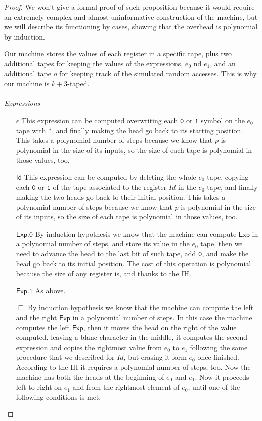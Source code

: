 \documentclass[10pt]{amsart}
\newcommand{\zero}{\mathtt{0}}
\newcommand{\one}{\mathtt{1}}
\newcommand{\id}{\mathsf{Id}}
\newcommand{\xp}{\mathsf{Exp}}
\begin{document}
\begin{proof}
We won't give a formal proof of such proposition because it would require an extremely complex and almost uninformative construction of the machine, but we will describe its functioning by cases, showing that the overhead is polynomial by induction.

Our machine stores the values of each register in a specific tape, plus two additional tapes for keeping the values of the expressions, $e_0$ nd $e_1$, and an additional tape $o$ for keeping track of the simulated random accesses. This is why our machine is $k+3$-taped.
\\\\
\emph{Expressions}
\begin{itemize}
\item[$\epsilon$] This expression can be computed overwriting each $\zero$ or $\one$ symbol on the $e_0$ tape with $*$, and finally making the head go back to its starting position. This takes a polynomial number of steps because we know that $p$ is polynomial in the size of its inputs, so the size of each tape is polynomial in those values, too.
\item[$\id$] This expression can be computed by deleting the whole $e_0$ tape, copying each $\zero$ or $\one$ of the tape associated to the register $Id$ in the $e_0$ tape, and finally making the two heads go back to their initial position. This takes a polynomial number of steps because we know that $p$ is polynomial in the size of its inputs, so the size of each tape is polynomial in those values, too. 
\item[$\xp.\zero$] By induction hypothesis we know that the machine can compute $\xp$ in a polynomial number of steps, and store its value in the $e_0$ tape, then we need to advance the head to the last bit of such tape, add $\zero$, and make the head go back to its initial position. The cost of this operation is polynomial because the size of any register is, and thanks to the IH. 
\item[$\xp.\one$] As above.
\item[$\sqsubseteq$] By induction hypothesis we know that the machine can compute the left and the right $\xp$ in a polynomial number of steps. In this case the machine computes the left $\xp$, then it moves the head on the right of the value computed, leaving a blanc character in the middle, it computes the second expression and copies the rightmost value from $e_0$ to $e_1$ following the same procedure that we described for $Id$, but erasing it form $e_0$ once finished. According to the IH it requires a polynomial number of steps, too. Now the machine has both the heads at the beginning of $e_0$ and $e_1$. Now it proceeds left-to right on $e_1$ and from the rightmost element of $e_0$, until one of the following conditions is met:

\end{itemize}
\end{proof}
\end{document}
